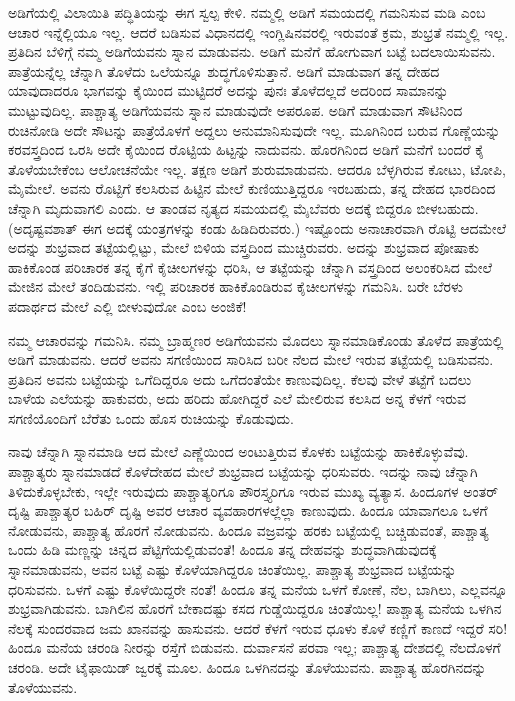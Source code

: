ಅಡಿಗೆಯಲ್ಲಿ ವಿಲಾಯಿತಿ ಪದ್ಧಿತಿಯನ್ನು ಈಗ ಸ್ವಲ್ಪ ಕೇಳಿ. ನಮ್ಮಲ್ಲಿ ಅಡಿಗೆ ಸಮಯದಲ್ಲಿ ಗಮನಿಸುವ ಮಡಿ ಎಂಬ ಆಚಾರ ಇನ್ನೆಲ್ಲಿಯೂ ಇಲ್ಲ. ಆದರೆ ಬಡಿಸುವ ವಿಧಾನದಲ್ಲಿ ಇಂಗ್ಲಿಷಿನವರಲ್ಲಿ ಇರುವಂತೆ ಕ್ರಮ, ಶುಭ್ರತೆ ನಮ್ಮಲ್ಲಿ ಇಲ್ಲ. ಪ್ರತಿದಿನ ಬೆಳಿಗ್ಗೆ ನಮ್ಮ ಅಡಿಗೆಯವನು ಸ್ನಾನ ಮಾಡುವನು. ಅಡಿಗೆ ಮನೆಗೆ ಹೋಗುವಾಗ ಬಟ್ಟೆ ಬದಲಾಯಿಸು\break ವನು. ಪಾತ್ರೆಯನ್ನೆಲ್ಲ ಚೆನ್ನಾಗಿ ತೊಳೆದು ಒಲೆಯನ್ನೂ ಶುದ್ಧಗೊಳಿಸುತ್ತಾನೆ. ಅಡಿಗೆ ಮಾಡುವಾಗ ತನ್ನ ದೇಹದ ಯಾವುದಾದರೂ ಭಾಗವನ್ನು ಕೈಯಿಂದ ಮುಟ್ಟಿದರೆ ಅದನ್ನು ಪುನಃ ತೊಳೆದಲ್ಲದೆ ಅದರಿಂದ ಸಾಮಾನನ್ನು ಮುಟ್ಟುವುದಿಲ್ಲ. ಪಾಶ್ಚಾತ್ಯ ಅಡಿಗೆಯವನು ಸ್ನಾನ ಮಾಡುವುದೇ ಅಪರೂಪ. ಅಡಿಗೆ ಮಾಡುವಾಗ ಸೌಟಿನಿಂದ ರುಚಿನೋಡಿ ಅದೇ ಸೌಟನ್ನು ಪಾತ್ರೆಯೊಳಗೆ ಅದ್ದಲು ಅನುಮಾನಿಸುವುದೇ ಇಲ್ಲ. ಮೂಗಿನಿಂದ ಬರುವ ಗೊಣ್ಣೆಯನ್ನು ಕರವಸ್ತ್ರದಿಂದ ಒರಸಿ ಅದೇ ಕೈಯಿಂದ ರೊಟ್ಟಿಯ ಹಿಟ್ಟನ್ನು ನಾದುವನು. ಹೊರಗಿನಿಂದ ಅಡಿಗೆ ಮನೆಗೆ ಬಂದರೆ ಕೈ ತೊಳೆಯಬೇಕೆಂಬ ಆಲೋಚನೆಯೇ ಇಲ್ಲ. ತಕ್ಷಣ ಅಡಿಗೆ ಶುರುಮಾಡುವನು. ಆದರೂ ಬೆಳ್ಳಗಿರುವ ಕೋಟು, ಟೋಪಿ, ಮೈಮೇಲೆ. ಅವನು ರೊಟ್ಟಿಗೆ ಕಲಸಿರುವ ಹಿಟ್ಟಿನ ಮೇಲೆ ಕುಣಿಯುತ್ತಿದ್ದರೂ ಇರಬಹುದು, ತನ್ನ ದೇಹದ ಭಾರದಿಂದ ಚೆನ್ನಾಗಿ ಮೃದುವಾಗಲಿ ಎಂದು. ಆ ತಾಂಡವ ನೃತ್ಯದ ಸಮಯದಲ್ಲಿ ಮೈಬೆವರು ಅದಕ್ಕೆ ಬಿದ್ದರೂ ಬೀಳಬಹುದು.(ಅದೃಷ್ಟವಶಾತ್​ ಈಗ ಅದಕ್ಕೆ ಯಂತ್ರಗಳನ್ನು ಕಂಡು ಹಿಡಿದಿರುವರು.) ಇಷ್ಟೊಂದು ಅನಾಚಾರವಾಗಿ ರೊಟ್ಟಿ ಆದಮೇಲೆ ಅದನ್ನು ಶುಭ್ರವಾದ ತಟ್ಟೆಯಲ್ಲಿಟ್ಟು, ಮೇಲೆ ಬಿಳಿಯ ವಸ್ತ್ರದಿಂದ ಮುಚ್ಚಿರುವರು. ಅದನ್ನು ಶುಭ್ರವಾದ ಪೋಷಾಕು ಹಾಕಿಕೊಂಡ ಪರಿಚಾರಕ ತನ್ನ ಕೈಗೆ ಕೈಚೀಲಗಳನ್ನು ಧರಿಸಿ, ಆ ತಟ್ಟೆಯನ್ನು ಚೆನ್ನಾಗಿ ವಸ್ತ್ರದಿಂದ ಅಲಂಕರಿಸಿದ ಮೇಲೆ ಮೇಜಿನ ಮೇಲೆ ತಂದಿಡುವನು. ಇಲ್ಲಿ ಪರಿಚಾರಕ ಹಾಕಿಕೊಂಡಿರುವ ಕೈಚೀಲಗಳನ್ನು ಗಮನಿಸಿ. ಬರೇ ಬೆರಳು ಪದಾರ್ಥದ ಮೇಲೆ ಎಲ್ಲಿ ಬೀಳುವುದೋ ಎಂಬ ಅಂಜಿಕೆ!

ನಮ್ಮ ಆಚಾರವನ್ನು ಗಮನಿಸಿ. ನಮ್ಮ ಬ್ರಾಹ್ಮಣರ ಅಡಿಗೆಯವನು ಮೊದಲು ಸ್ನಾನಮಾಡಿಕೊಂಡು ತೊಳೆದ ಪಾತ್ರೆಯಲ್ಲಿ ಅಡಿಗೆ ಮಾಡುವನು. ಆದರೆ ಅವನು ಸಗಣಿ\break ಯಿಂದ ಸಾರಿಸಿದ ಬರೀ ನೆಲದ ಮೇಲೆ ಇರುವ ತಟ್ಟೆಯಲ್ಲಿ ಬಡಿಸುವನು. ಪ್ರತಿದಿನ ಅವನು ಬಟ್ಟೆಯನ್ನು ಒಗೆದಿದ್ದರೂ ಅದು ಒಗೆದಂತೆಯೇ ಕಾಣುವುದಿಲ್ಲ. ಕೆಲವು ವೇಳೆ ತಟ್ಟೆಗೆ ಬದಲು ಬಾಳೆಯ ಎಲೆಯನ್ನು ಹಾಕುವರು, ಅದು ಹರಿದು ಹೋಗಿದ್ದರೆ ಎಲೆ ಮೇಲಿರುವ ಕಲಸಿದ ಅನ್ನ ಕೆಳಗೆ ಇರುವ ಸಗಣಿಯೊಂದಿಗೆ ಬೆರೆತು ಒಂದು ಹೊಸ ರುಚಿಯನ್ನು ಕೊಡುವುದು.

\newpage

ನಾವು ಚೆನ್ನಾಗಿ ಸ್ನಾನಮಾಡಿ ಆದ ಮೇಲೆ ಎಣ್ಣೆಯಿಂದ ಅಂಟುತ್ತಿರುವ ಕೊಳಕು ಬಟ್ಟೆಯನ್ನು ಹಾಕಿಕೊಳ್ಳುವೆವು. ಪಾಶ್ಚಾತ್ಯರು ಸ್ನಾನಮಾಡದೆ ಕೊಳೆದೇಹದ ಮೇಲೆ ಶುಭ್ರ\break ವಾದ ಬಟ್ಟೆಯನ್ನು ಧರಿಸುವರು. ಇದನ್ನು ನಾವು ಚೆನ್ನಾಗಿ ತಿಳಿದುಕೊಳ್ಳಬೇಕು, ಇಲ್ಲೇ ಇರುವುದು ಪಾಶ್ಚಾತ್ಯರಿಗೂ ಪೌರಸ್ತ್ಯರಿಗೂ ಇರುವ ಮುಖ್ಯ ವ್ಯತ್ಯಾಸ. ಹಿಂದೂಗಳ ಅಂತರ್​ ದೃಷ್ಟಿ ಪಾಶ್ಚಾತ್ಯರ ಬಹಿರ್​ ದೃಷ್ಟಿ ಅವರ ಆಚಾರ ವ್ಯವಹಾರಗಳಲ್ಲೆಲ್ಲಾ ಕಾಣುವುದು. ಹಿಂದೂ ಯಾವಾಗಲೂ ಒಳಗೆ ನೋಡುವನು, ಪಾಶ್ಚಾತ್ಯ ಹೊರಗೆ ನೋಡುವನು. ಹಿಂದೂ ವಜ್ರವನ್ನು ಹರಕು ಬಟ್ಟೆಯಲ್ಲಿ ಬಚ್ಚಿಡುವಂತೆ, ಪಾಶ್ಚಾತ್ಯ ಒಂದು ಹಿಡಿ ಮಣ್ಣನ್ನು ಚಿನ್ನದ ಪೆಟ್ಟಿಗೆಯಲ್ಲಿಡುವಂತೆ! ಹಿಂದೂ ತನ್ನ ದೇಹವನ್ನು ಶುದ್ಧವಾಗಿಡುವುದಕ್ಕೆ ಸ್ನಾನಮಾಡುವನು, ಅವನ ಬಟ್ಟೆ ಎಷ್ಟು ಕೊಳೆಯಾಗಿದ್ದರೂ ಚಿಂತೆಯಿಲ್ಲ. ಪಾಶ್ಚಾತ್ಯ ಶುಭ್ರವಾದ ಬಟ್ಟೆಯನ್ನು ಧರಿಸುವನು. ಒಳಗೆ ಎಷ್ಟು ಕೊಳೆಯಿದ್ದರೇ ನಂತೆ! ಹಿಂದೂ ತನ್ನ ಮನೆಯ ಒಳಗೆ ಕೋಣೆ, ನೆಲ, ಬಾಗಿಲು, ಎಲ್ಲವನ್ನೂ ಶುಭ್ರವಾಗಿಡುವನು. ಬಾಗಿಲಿನ ಹೊರಗೆ ಬೇಕಾದಷ್ಟು ಕಸದ ಗುಡ್ಡೆಯಿದ್ದರೂ ಚಿಂತೆಯಿಲ್ಲ! ಪಾಶ್ಚಾತ್ಯ ಮನೆಯ ಒಳಗಿನ ನೆಲಕ್ಕೆ ಸುಂದರವಾದ ಜಮ ಖಾನವನ್ನು ಹಾಸುವನು. ಆದರೆ ಕೆಳಗೆ ಇರುವ ಧೂಳು ಕೊಳೆ ಕಣ್ಣಿಗೆ ಕಾಣದೆ ಇದ್ದರೆ ಸರಿ! ಹಿಂದೂ ಮನೆಯ ಚರಂಡಿ ನೀರನ್ನು ರಸ್ತೆಗೆ ಬಿಡುವನು. ದುರ್ವಾಸನೆ ಪರವಾ ಇಲ್ಲ; ಪಾಶ್ಚಾತ್ಯ ದೇಶದಲ್ಲಿ ನೆಲದೊಳಗೆ ಚರಂಡಿ. ಅದೇ ಟೈಫಾಯಿಡ್​ ಜ್ವರಕ್ಕೆ ಮೂಲ. ಹಿಂದೂ ಒಳಗಿನದನ್ನು ತೊಳೆಯುವನು. ಪಾಶ್ಚಾತ್ಯ ಹೊರಗಿನದನ್ನು ತೊಳೆಯುವನು.

